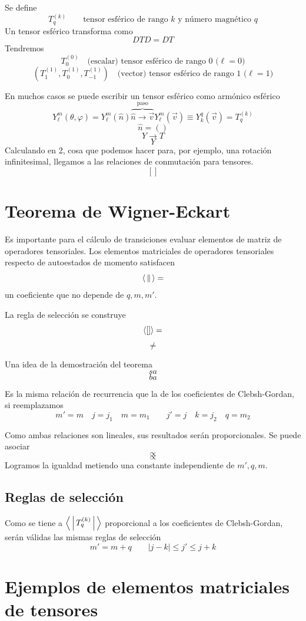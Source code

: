 \documentclass[10pt,oneside]{CBFT_book}
\begin{document}
Se define 
\[
	T^{(k)}_q \qquad \text{tensor esférico de rango $k$ y número magnético $q$}
\]
Un tensor esférico transforma como 
\[
	D T D = D T 
\]
Tendremos 
\[
	T^{(0)}_0 \quad \text{(escalar) tensor esférico de rango 0 ($\ell=0$)}
\]
\[
	(T^{(1)}_1,T^{(1)}_0,T^{(1)}_{-1}) \quad \text{(vector) tensor esférico de rango 1 ($\ell=1$)}
\]

En muchos casos se puede escribir un tensor esférico como armónico esférico 
\[
	Y_\ell^{m}(\theta,\varphi) = Y_\ell^{m}(\hat{n})  \overbrace{\hat{n} \longrightarrow 
	\vec{v}}^{\text{paso}} Y_\ell^m(\vec{v}) \equiv Y_k^q(\vec{v}) = T_q^{(k)}
\]
\[
	\hat{n} = ()
\]
\[
	Y \longrightarrow T
\]
\[
	Y
\]
Calculando en 2, cosa que podemos hacer para, por ejemplo, una rotación infinitesimal, llegamos a las 
relaciones de conmutación para tensores.
\[
	[]
\]


\section{Teorema de Wigner-Eckart}

Es importante para el cálculo de transiciones evaluar elementos de matriz de operadores tensoriales.
Los elementos matriciales de operadores tensoriales respecto de autoestados de momento satisfacen 
\[
	\Braket{||} =
\]
un coeficiente que no depende de $q,m,m'$.

La regla de selección se construye 
\[
	\Braket{[]} =
\]
\[
	\neq
\]

Una idea de la demostración del teorema
\[
	sa
\]
\[
	ba
\]

Es la misma relación de recurrencia que la de los coeficientes de Clebsh-Gordan, si reemplazamos
\[
	m'=m \quad j=j_1 \quad m=m_1 \qquad j'=j \quad k=j_2 \quad q=m_2
\]

Como ambas relaciones son lineales, sus resultados serán proporcionales.
Se puede asociar 
\[
	\propto 
\]
\[
	\propto
\]
Logramos la igualdad metiendo una constante independiente de $m',q,m$.

\subsection{Reglas de selección}

Como se tiene a $\Braket{|T_q^{(k)}|}$ proporcional a los coeficientes de Clebsh-Gordan, serán válidas las 
mismas reglas de selección 
\[
	m' = m + q \qquad |j-k| \leq j' \leq j+k
\]

\section{Ejemplos de elementos matriciales de tensores}
\end{document}
